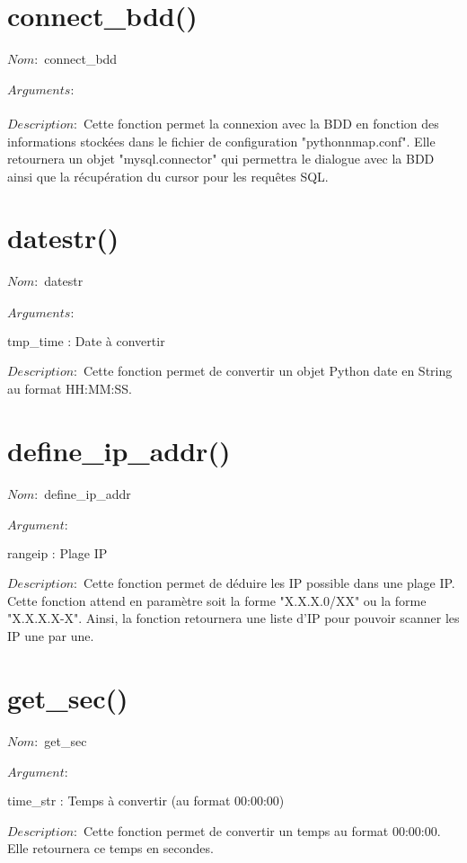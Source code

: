 \documentclass[12pt]{report}
\begin{document}
		\section{connect\_bdd()}
			{\setlength{\parindent}{0cm}
			$Nom :$ connect\_bdd\\\\
			}
			$Arguments :$\\\\
			$Description : $ Cette fonction permet la connexion avec la BDD en fonction des informations stockées dans le fichier de configuration "pythonnmap.conf". Elle retournera un objet "mysql.connector" qui permettra le dialogue avec la BDD ainsi que la récupération du cursor pour les requêtes SQL.
		\section{datestr()}
			{\setlength{\parindent}{0cm}
			$Nom :$ datestr\\\\
			}
			$Arguments :$
			\begin{description}
				\item tmp\_time : Date à convertir\\
			\end{description}
			$Description : $ Cette fonction permet de convertir un objet Python date en String au format HH:MM:SS.
		\section{define\_ip\_addr()}
			{\setlength{\parindent}{0cm}
			$Nom :$ define\_ip\_addr\\\\
			}
			$Argument :$
			\begin{description}
				\item rangeip : Plage IP\\
			\end{description}
			$Description : $ Cette fonction permet de déduire les IP possible dans une plage IP. Cette fonction attend en paramètre soit la forme "X.X.X.0/XX" ou la forme "X.X.X.X-X". Ainsi, la fonction retournera une liste d'IP pour pouvoir scanner les IP une par une.
		\section{get\_sec()}
			{\setlength{\parindent}{0cm}
			$Nom :$ get\_sec\\\\
			}
			$Argument :$
			\begin{description}
				\item time\_str : Temps à convertir (au format 00:00:00)\\
			\end{description}
			$Description :$ Cette fonction permet de convertir un temps au format 00:00:00. Elle retournera ce temps en secondes.
\end{document}
